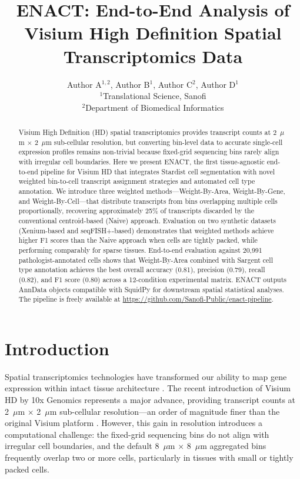 \documentclass[11pt]{article}
\title{ENACT: End-to-End Analysis of Visium High Definition Spatial Transcriptomics Data}
\author{Author A$^{1,2}$, Author B$^{1}$, Author C$^{2}$, Author D$^{1}$\\[6pt]
$^{1}$Translational Science, Sanofi\\
$^{2}$Department of Biomedical Informatics}
\date{}
\begin{document}
\maketitle

\begin{abstract}
Visium High Definition (HD) spatial transcriptomics provides transcript counts at 2~$\mu$m $\times$ 2~$\mu$m sub-cellular resolution, but converting bin-level data to accurate single-cell expression profiles remains non-trivial because fixed-grid sequencing bins rarely align with irregular cell boundaries. Here we present ENACT, the first tissue-agnostic end-to-end pipeline for Visium HD that integrates Stardist cell segmentation with novel weighted bin-to-cell transcript assignment strategies and automated cell type annotation. We introduce three weighted methods---Weight-By-Area, Weight-By-Gene, and Weight-By-Cell---that distribute transcripts from bins overlapping multiple cells proportionally, recovering approximately 25\% of transcripts discarded by the conventional centroid-based (Naive) approach. Evaluation on two synthetic datasets (Xenium-based and seqFISH+-based) demonstrates that weighted methods achieve higher F1 scores than the Naive approach when cells are tightly packed, while performing comparably for sparse tissues. End-to-end evaluation against 20,991 pathologist-annotated cells shows that Weight-By-Area combined with Sargent cell type annotation achieves the best overall accuracy (0.81), precision (0.79), recall (0.82), and F1 score (0.80) across a 12-condition experimental matrix. ENACT outputs AnnData objects compatible with SquidPy for downstream spatial statistical analyses. The pipeline is freely available at \url{https://github.com/Sanofi-Public/enact-pipeline}.
\end{abstract}

\section{Introduction}

Spatial transcriptomics technologies have transformed our ability to map gene expression within intact tissue architecture \citep{stahl2016visium, chen2022spatiotemporal}. The recent introduction of Visium HD by 10x Genomics represents a major advance, providing transcript counts at 2~$\mu$m $\times$ 2~$\mu$m sub-cellular resolution---an order of magnitude finer than the original Visium platform \citep{10xgenomics2023visiumhd}. However, this gain in resolution introduces a computational challenge: the fixed-grid sequencing bins do not align with irregular cell boundaries, and the default 8~$\mu$m $\times$ 8~$\mu$m aggregated bins frequently overlap two or more cells, particularly in tissues with small or tightly packed cells.
\end{document}
